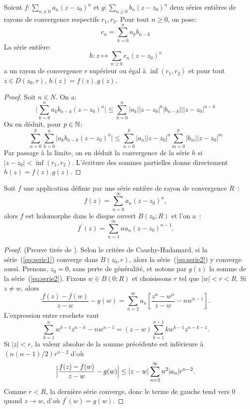 \begin{fprop}
Soient $f \colon \sum_{n \neq 0}a_n(z-z_0)^n$ et $g \colon \sum_{n \geq 0} b_n (z-z_0)^n$ deux séries entières de rayons de convergence respectifs $r_1,r_2$. 
Pour tout $n \geq 0$, on pose:
\[
c_n = \sum_{k=0}^n a_k b_{n-k}
\]
La série entière:
\[
h \colon z \mapsto \sum_{n \geq 0} c_n (z-z_0)^n
\]
a un rayon de convergence $r$ supérieur ou égal à $\inf(r_1,r_2)$ et pour tout $z \in D(z_0,r), \, h(z) = f(z).g(z)$.
\end{fprop}
\begin{proof}
Soit $n \in N$. On a:
\[
\lvert \sum_{k=0}^n a_k b_{n-k} (z-z_0)^n\rvert \leq \sum_{k=0}^n \lvert a_k\rvert\lvert z- z_0\rvert^k \lvert b_{n-k}\rvert \lvert|z-z_0|^{n-k}
\]
On en déduit, pour $p \in {\mathbb N}$:
\[
\sum_{n = 0}^p  \sum_{k=0}^n \lvert a_k b_{n-k} (z-z_0)^n\rvert \leq \sum_{n=0}^p |a_n| |z-z_0|^n \sum_{m=0}^p |b_m||z-z_0|^m
\]
Par passage à la limite, on en déduit la convergence de la série $h$ si $|z-z_0| < \inf(r_1,r_2)$. L'écriture des sommes partielles donne directement $h(z)=f(z).g(z)$.
\end{proof}
\begin{fthm}
Soit $f$ une application définie par une série entière de rayon de
convergence $R$~:
\begin{equation}\label{eq:serie1}
f(z) = \sum_{n =0}^\infty a_n (z-z_0)^n,
\end{equation}
alors $f$ est holomorphe dans le disque ouvert $B(z_0 ; R)$ et l'on a~:
\begin{equation}\label{eq:serie2}
f^\prime(z) = \sum_{n = 1}^\infty n a_{n} (z-z_0)^{n-1}.
\end{equation}
\end{fthm}
\begin{proof}{(Preuve tirée de \cite{rudin1988analyse}).}
Selon le critère de Cauchy-Hadamard, si la série~(\ref{eq:serie1}) converge dans $B(z_0,r)$, alors la série~(\ref{eq:serie2}) y converge aussi. 
Prenons, $z_0=0$, sans perte de généralité, et notons par $g(z)$ la somme de la série~(\ref{eq:serie2}). Fixons $w \in B(0 ; R)$ et choisissons $r$ tel que $\lvert w \rvert < r <R$. Si $z \neq w$, alors
\[\frac{f(z) - f(w)}{z-w}-g(w)=\sum_{n=2}^\infty a_n \left[  \frac{z^n-w^n}{z-w} - n w^{n-1}\right].\]
L'expression entre crochets vaut
\[\sum_{k=1}^n w^{k-1}z^{n-k} - n w^{n-1} = (z-w) \sum_{k=1}^{n-1} k w^{k-1}z^{n-k-1}.\]
Si $\lvert z \rvert <r$, la valeur absolue de la somme précédente est inférieure à $\left(n(n-1)/2\right) r^{n-2}$
d'où
\[\Bigl | \frac{f(z) - f(w)}{z-w}-g(w) \Bigr |  \leq \lvert z-w \rvert \sum_{n=2}^\infty n^2 \lvert a_n \rvert r^{n-2}.\]
Comme $r<R$, la dernière série converge, donc le terme de gauche tend vers $0$ quand $z \to w$, d'où $f^\prime(w)=g(w)$. 
\end{proof}

